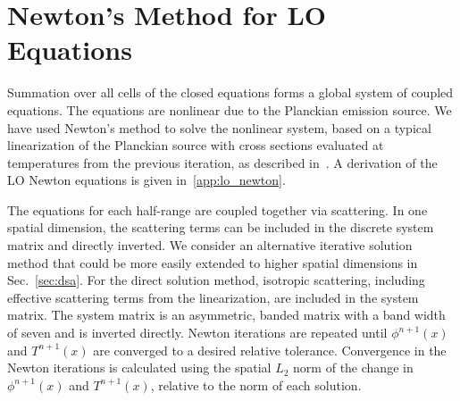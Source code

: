 \section{Newton's Method for LO Equations}

Summation over all cells of the closed equations forms a global system of coupled equations.
The equations are nonlinear due to the Planckian emission source.  
We have used Newton's method to solve the nonlinear system, based on a typical linearization of the Planckian source with cross
sections evaluated at temperatures from the previous iteration, as described
in~\cite{morel_ldtrt}.  A derivation of the LO Newton equations is given
in~\ref{app:lo_newton}.

The equations for each half-range are coupled together via scattering.  
In one spatial dimension, the scattering terms can be included in the discrete system
matrix and directly inverted.  We consider an alternative iterative solution method that
could be more easily extended to higher spatial dimensions in Sec.~\ref{sec:dsa}.
For the direct solution method, isotropic scattering,
including effective scattering terms from the linearization, are included in the system matrix. The system
matrix is an asymmetric, banded matrix with a band width of seven and is inverted
directly. 
Newton iterations are repeated until $\phi^{n+1}(x)$ and $T^{n+1}(x)$ are converged
to a desired relative tolerance.  Convergence in the Newton iterations is calculated using the spatial $L_2$
norm of the change in $\phi^{n+1}(x)$ and $T^{n+1}(x)$, relative to the norm of each
solution.  


